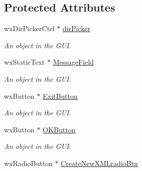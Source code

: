 \subsection*{Protected Attributes}
\begin{DoxyCompactItemize}
\item 
\hypertarget{classChoiceFrame_a6ed5fc62946c154838f10c75e45b16cb}{
wxDirPickerCtrl $\ast$ \hyperlink{classChoiceFrame_a6ed5fc62946c154838f10c75e45b16cb}{dirPicker}}
\label{classChoiceFrame_a6ed5fc62946c154838f10c75e45b16cb}

\begin{DoxyCompactList}\small\item\em An object in the GUI. \item\end{DoxyCompactList}\item 
\hypertarget{classChoiceFrame_ae78facd2386f558d67ef5baee0fa5fca}{
wxStaticText $\ast$ \hyperlink{classChoiceFrame_ae78facd2386f558d67ef5baee0fa5fca}{MessageField}}
\label{classChoiceFrame_ae78facd2386f558d67ef5baee0fa5fca}

\begin{DoxyCompactList}\small\item\em An object in the GUI. \item\end{DoxyCompactList}\item 
\hypertarget{classChoiceFrame_a1de325ab936306c560df98e9e75ffaed}{
wxButton $\ast$ \hyperlink{classChoiceFrame_a1de325ab936306c560df98e9e75ffaed}{ExitButton}}
\label{classChoiceFrame_a1de325ab936306c560df98e9e75ffaed}

\begin{DoxyCompactList}\small\item\em An object in the GUI. \item\end{DoxyCompactList}\item 
\hypertarget{classChoiceFrame_a399c1a2e37749a29f5c02acb917b1570}{
wxButton $\ast$ \hyperlink{classChoiceFrame_a399c1a2e37749a29f5c02acb917b1570}{OKButton}}
\label{classChoiceFrame_a399c1a2e37749a29f5c02acb917b1570}

\begin{DoxyCompactList}\small\item\em An object in the GUI. \item\end{DoxyCompactList}\item 
\hypertarget{classChoiceFrame_a92a5a8f903e2faef896649df4f800d96}{
wxRadioButton $\ast$ \hyperlink{classChoiceFrame_a92a5a8f903e2faef896649df4f800d96}{CreateNewXMLradioBtn}}
\label{classChoiceFrame_a92a5a8f903e2faef896649df4f800d96}


\end{DoxyCompactItemize}
